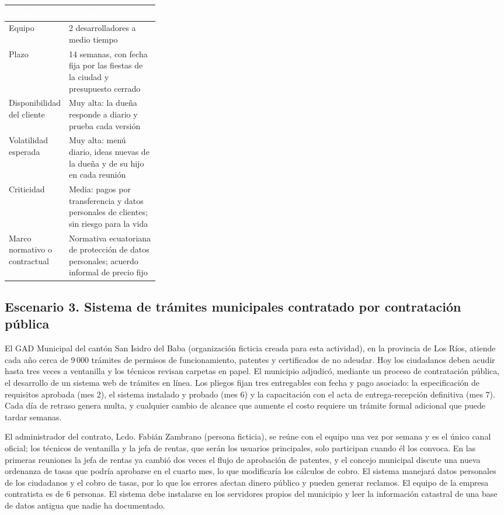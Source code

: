\documentclass[11pt]{article}
\newcommand{\thdr}[1]{\cellcolor{utegreen}\textcolor{white}{\textbf{#1}}}
\newcommand{\subseccion}[1]{\subsection{\textcolor{midblue}{#1}}}
\begin{document}
\noindent\begin{tabularx}{\linewidth}{|L{0.30\linewidth}|Y|}
	\hline
	\thdr{Datos clave} & \thdr{Escenario 2}\\
	\hline
	Equipo & 2 desarrolladores a medio tiempo\\
	\hline
	 Plazo & 14 semanas, con fecha fija por las fiestas de la ciudad y presupuesto cerrado\\
	\hline
	Disponibilidad del cliente & Muy alta: la dueña responde a diario y prueba cada versión\\
	\hline
	 Volatilidad esperada & Muy alta: menú diario, ideas nuevas de la dueña y de su hijo en cada reunión\\
	\hline
	Criticidad & Media: pagos por transferencia y datos personales de clientes; sin riesgo para la vida\\
	\hline
	 Marco normativo o contractual & Normativa ecuatoriana de protección de datos personales; acuerdo informal de precio fijo\\
	\hline
\end{tabularx}

\subseccion{Escenario 3. Sistema de trámites municipales contratado por contratación pública}

El GAD Municipal del cantón San Isidro del Baba (organización ficticia creada para esta actividad), en la provincia de Los Ríos, atiende cada año cerca de 9\,000 trámites de permisos de funcionamiento, patentes y certificados de no adeudar. Hoy los ciudadanos deben acudir hasta tres veces a ventanilla y los técnicos revisan carpetas en papel. El municipio adjudicó, mediante un proceso de contratación pública, el desarrollo de un sistema web de trámites en línea. Los pliegos fijan tres entregables con fecha y pago asociado: la especificación de requisitos aprobada (mes 2), el sistema instalado y probado (mes 6) y la capacitación con el acta de entrega-recepción definitiva (mes 7). Cada día de retraso genera multa, y cualquier cambio de alcance que aumente el costo requiere un trámite formal adicional que puede tardar semanas.

El administrador del contrato, Lcdo. Fabián Zambrano (persona ficticia), se reúne con el equipo una vez por semana y es el único canal oficial; los técnicos de ventanilla y la jefa de rentas, que serán los usuarios principales, solo participan cuando él los convoca. En las primeras reuniones la jefa de rentas ya cambió dos veces el flujo de aprobación de patentes, y el concejo municipal discute una nueva ordenanza de tasas que podría aprobarse en el cuarto mes, lo que modificaría los cálculos de cobro. El sistema manejará datos personales de los ciudadanos y el cobro de tasas, por lo que los errores afectan dinero público y pueden generar reclamos. El equipo de la empresa contratista es de 6 personas. El sistema debe instalarse en los servidores propios del municipio y leer la información catastral de una base de datos antigua que nadie ha documentado.
\end{document}
